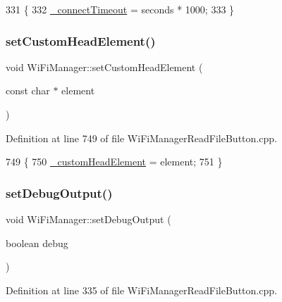\begin{DoxyCode}
331                                                          \{
332   \hyperlink{class_wi_fi_manager_a6c03ca5d418b4d46e9a6d751a902184c}{\_connectTimeout} = seconds * 1000;
333 \}
\end{DoxyCode}
\mbox{\label{class_wi_fi_manager_a85570bcfe03da48c4be75b8e4302c4db}} 
\subsubsection{\texorpdfstring{set\+Custom\+Head\+Element()}{setCustomHeadElement()}}
{\footnotesize\ttfamily void Wi\+Fi\+Manager\+::set\+Custom\+Head\+Element (\begin{DoxyParamCaption}\item[{const char $\ast$}]{element }\end{DoxyParamCaption})}



Definition at line 749 of file Wi\+Fi\+Manager\+Read\+File\+Button.\+cpp.


\begin{DoxyCode}
749                                                           \{
750   \hyperlink{class_wi_fi_manager_a8860012564a62209d750c50e56319192}{\_customHeadElement} = element;
751 \}
\end{DoxyCode}
\mbox{\label{class_wi_fi_manager_a70d7f17596b9f10c3e4770702ac991c5}} 
\subsubsection{\texorpdfstring{set\+Debug\+Output()}{setDebugOutput()}}
{\footnotesize\ttfamily void Wi\+Fi\+Manager\+::set\+Debug\+Output (\begin{DoxyParamCaption}\item[{boolean}]{debug }\end{DoxyParamCaption})}



Definition at line 335 of file Wi\+Fi\+Manager\+Read\+File\+Button.\+cpp.


